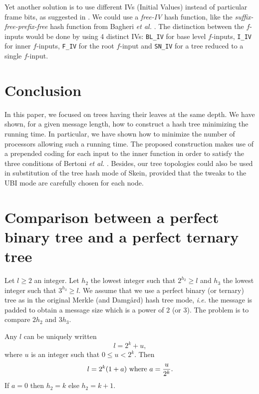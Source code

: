 \documentclass{llncs}
\begin{document}
\begin{remark}
 Yet another solution is to use different IVs (Initial Values) instead of particular frame bits, as suggested in \cite{BDPV14_Suf,luk13}. We could use a \emph{free-IV} hash function,
 like the \emph{suffix-free-prefix-free} hash function from Bagheri \emph{et al.} \cite{BGKZ12}. The distinction between the $f$-inputs would be done by using 4 distinct 
 IVs: \texttt{BL\_IV} for base level $f$-inputs, \texttt{I\_IV} for inner $f$-inputs, \texttt{F\_IV} for the root $f$-input and \texttt{SN\_IV} for a tree reduced to
 a single $f$-input.
\end{remark}



\section{Conclusion}

In this paper, we focused on trees having their leaves at the same depth. 
We have shown, for a given message length, 
how to construct a hash tree minimizing the running time. 
In particular, we have shown how to minimize the
number of processors allowing such a running time. 
The proposed construction makes use of a prepended 
coding for each input to the inner function in order to satisfy 
the three conditions of Bertoni \textit{et al.} \cite{BDPV14_Suf}.
Besides, our tree topologies could also be used in substitution of
the tree hash mode of Skein, provided that the tweaks to 
the UBI mode are carefully chosen for each node.







\newpage

\appendix

\section{Comparison between a perfect binary tree and a perfect ternary tree}\label{comp}
Let $l\geq 2$ an integer.
Let $h_2$ the lowest integer such that $2^{h_2} \geq l$ and $h_3$ the lowest integer such that $3^{h_3} \geq l$.
We assume that we use a perfect binary (or ternary) tree as in the original Merkle (and Damg{\aa}rd) hash tree mode,
\emph{i.e.} the message is padded to obtain a message size which is a power of $2$ (or $3$).
The problem is to compare $2h_2$ and $3h_3$.

Any $l$ can be uniquely written
\[l=2^k+u,\]
where $u$ is an integer such that $0 \leq u <2^k$. Then
\[l= 2^k(1+a) \hbox{ where } a=\frac{u}{2^k}.\]
If $a=0$ then $h_2=k$ else $h_2=k+1$.
\end{document}
